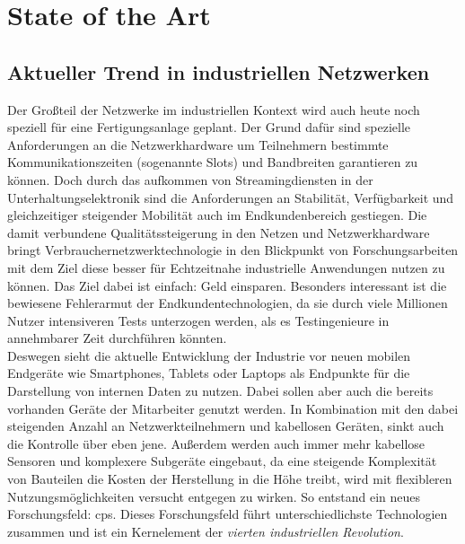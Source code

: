 \chapter{State of the Art}
\section{Aktueller Trend in industriellen Netzwerken}
Der Großteil der Netzwerke im industriellen Kontext wird auch heute noch speziell für eine Fertigungsanlage geplant. Der Grund dafür sind spezielle Anforderungen an die Netzwerkhardware um Teilnehmern bestimmte Kommunikationszeiten (sogenannte Slots) und Bandbreiten garantieren zu können. Doch durch das aufkommen von Streamingdiensten in der Unterhaltungselektronik sind die Anforderungen an Stabilität, Verfügbarkeit und gleichzeitiger steigender Mobilität auch im Endkundenbereich gestiegen. Die damit verbundene Qualitätssteigerung in den Netzen und Netzwerkhardware bringt Verbrauchernetzwerktechnologie in den Blickpunkt von Forschungsarbeiten mit dem Ziel diese besser für Echtzeitnahe industrielle Anwendungen nutzen zu können\cite{wollschlaeger2017future}. Das Ziel dabei ist einfach: Geld einsparen. Besonders interessant ist die bewiesene Fehlerarmut der Endkundentechnologien, da sie durch viele Millionen Nutzer intensiveren Tests unterzogen werden, als es Testingenieure in annehmbarer Zeit durchführen könnten.\\
Deswegen sieht die aktuelle Entwicklung der Industrie vor neuen mobilen Endgeräte wie Smartphones, Tablets oder Laptops als Endpunkte für die Darstellung von internen Daten zu nutzen. Dabei sollen aber auch die bereits vorhanden Geräte der Mitarbeiter genutzt werden\cite{french2014current}. In Kombination mit den dabei steigenden Anzahl an Netzwerkteilnehmern und kabellosen Geräten, sinkt auch die Kontrolle über eben jene. Außerdem werden auch immer mehr kabellose Sensoren und komplexere Subgeräte eingebaut, da eine steigende Komplexität von Bauteilen die Kosten der Herstellung in die Höhe treibt, wird mit flexibleren Nutzungsmöglichkeiten versucht entgegen zu wirken. So entstand ein neues Forschungsfeld: \acrlong{cps}. Dieses Forschungsfeld führt unterschiedlichste Technologien zusammen und ist ein Kernelement der \textit{vierten industriellen Revolution}.\\
